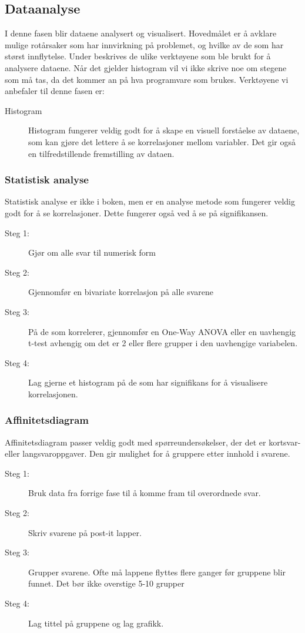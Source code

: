 \subsection{Dataanalyse}
I denne fasen blir dataene analysert og visualisert. Hovedmålet er å avklare mulige rotårsaker som har innvirkning på problemet, og hvilke av de som har størst innflytelse. Under beskrives de ulike verktøyene som ble brukt for å analysere dataene.
Når det gjelder histogram vil vi ikke skrive noe om stegene som må tas, da det kommer an på hva programvare som brukes. Verktøyene vi anbefaler til denne fasen er:

\begin{description}
    \item[Histogram] Histogram fungerer veldig godt for å skape en visuell forståelse av dataene, som kan gjøre det lettere å se korrelasjoner mellom variabler. Det gir også en tilfredstillende fremstilling av dataen. 
\end{description}

\subsubsection{Statistisk analyse}
Statistisk analyse er ikke i boken, men er en analyse metode som fungerer veldig godt for å se korrelasjoner. Dette fungerer også ved å se på signifikansen.
\begin{description}
    \item[Steg 1:] Gjør om alle svar til numerisk form
    \item[Steg 2:] Gjennomfør en bivariate korrelasjon på alle svarene
    \item[Steg 3:] På de som korrelerer, gjennomfør en One-Way ANOVA eller en uavhengig t-test avhengig om det er 2 eller flere grupper i den uavhengige variabelen.
    \item[Steg 4:] Lag gjerne et histogram på de som har signifikans for å visualisere korrelasjonen.
\end{description}

\subsubsection{Affinitetsdiagram} Affinitetsdiagram passer veldig godt med spørreundersøkelser, der det er kortsvar- eller langsvaroppgaver. Den gir mulighet for å gruppere etter innhold i svarene. 
\begin{description}
    \item[Steg 1:] Bruk data fra forrige fase til å komme fram til overordnede svar.
    \item[Steg 2:] Skriv svarene på post-it lapper.
    \item[Steg 3:] Grupper svarene. Ofte må lappene flyttes flere ganger før gruppene blir funnet. Det bør ikke overstige 5-10 grupper 
    \item[Steg 4:] Lag tittel på gruppene og lag grafikk. 
\end{description}

